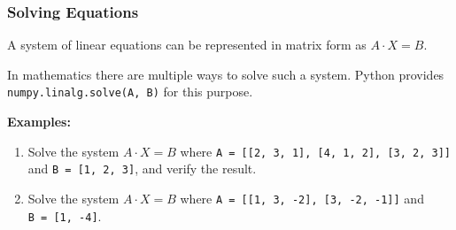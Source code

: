 \documentclass[11pt]{article}
\begin{document}
    \newpage

\subsubsection{Solving Equations}\label{solving-equations}

A system of linear equations can be represented in matrix form as
\(A \cdot X = B\).

In mathematics there are multiple ways to solve such a system. Python
provides \texttt{numpy.linalg.solve(A,\ B)} for this purpose.

\textbf{Examples:}

\begin{enumerate}
\def\labelenumi{\arabic{enumi}.}
\item
  Solve the system \(A \cdot X = B\) where
  \texttt{A\ =\ {[}{[}2,\ 3,\ 1{]},\ {[}4,\ 1,\ 2{]},\ {[}3,\ 2,\ 3{]}{]}}
  and \texttt{B\ =\ {[}1,\ 2,\ 3{]}}, and verify the result.
\item
  Solve the system \(A \cdot X = B\) where
  \texttt{A\ =\ {[}{[}1,\ 3,\ -2{]},\ {[}3,\ -2,\ -1{]}{]}} and
  \texttt{B\ =\ {[}1,\ -4{]}}.
\end{enumerate}
\end{document}
